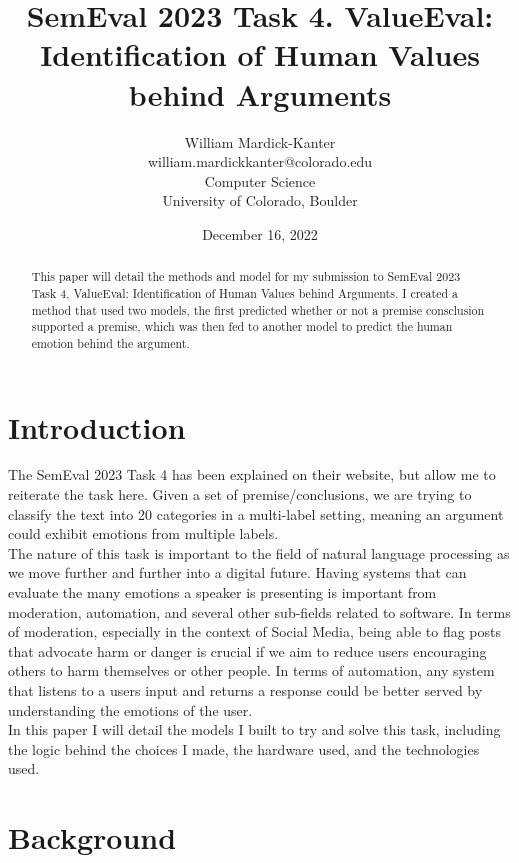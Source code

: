 \documentclass[11pt,a4paper]{article}
\title{SemEval 2023 Task 4. ValueEval: 
Identification of Human Values behind Arguments}
\author{\name William Mardick-Kanter  \\ \email william.mardickkanter@colorado.edu\\
  \addr Computer Science \\
  University of Colorado, Boulder \\
  }
\date{December 16, 2022}
\begin{document}
\maketitle
\begin{abstract}
This paper will detail the methods and model for my submission to SemEval 2023 Task 4, ValueEval: 
Identification of Human Values behind Arguments. I created a method that used two models, the first 
predicted whether or not a premise consclusion supported a premise, which was then fed to another 
model to predict the human emotion behind the argument.
\end{abstract}


\section{Introduction}

The SemEval 2023 Task 4 has been explained on their website, but allow me to reiterate the task here. Given a set
of premise/conclusions, we are trying to classify the text into 20 categories in a multi-label setting, meaning 
an argument could exhibit emotions from multiple labels. \\
\indent The nature of this task is important to the field of natural language processing as we move further and 
further into a digital future. Having systems that can evaluate the many emotions a speaker is presenting is 
important from moderation, automation, and several other sub-fields related to software. In terms of moderation,
especially in the context of Social Media, being able to flag posts that advocate harm or danger is crucial if we 
aim to reduce users encouraging others to harm themselves or other people. In terms of automation, any system that
listens to a users input and returns a response could be better served by understanding the emotions of the user. \\
\indent In this paper I will detail the models I built to try and solve this task, including the logic behind the
choices I made, the hardware used, and the technologies used.

\section{Background}
\end{document}
